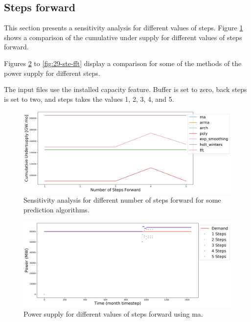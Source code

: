 \documentclass[11pt]{article}
\begin{document}
\subsection{Steps forward}

This section presents a sensitivity analysis for different values of steps.
Figure \ref{fig:29-steps} shows a comparison of the cumulative under supply for different values of steps forward.

Figures \ref{fig:29-ste-ma} to \ref{fig:29-ste-fft} display a comparison for some of the methods of the power supply for different steps.

The input files use the installed capacity feature. Buffer is set to zero, back steps is set to two, and steps takes the values 1, 2, 3, 4, and 5.

\begin{figure}[H]
	\centering
	\includegraphics[width=\textwidth]{29-figures/29-sens-steps.png} 
	\hfill
	\caption{Sensitivity analysis for different number of steps forward for some prediction algorithms.}
	\label{fig:29-steps}
\end{figure}

\begin{figure}[H]
	\centering
	\includegraphics[width=\textwidth]{29-figures/29-power-buffer0-ma-steps.png} 
	\hfill
	\caption{Power supply for different values of steps forward using ma.}
	\label{fig:29-ste-ma}
\end{figure}
\end{document}
